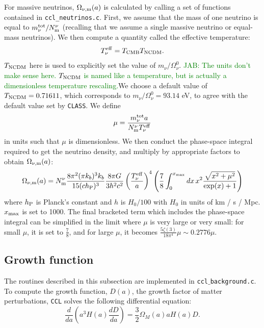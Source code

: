 \documentclass[\docopts]{\docclass}
\newcommand{\jab}[1]{\textcolor{green}{JAB: #1}}
\begin{document}
For massive neutrinos, $\Omega_{\nu, {\rm m}}(a)$ is calculated by calling a set of functions contained in {\tt ccl\_neutrinos.c}. First, we assume that the mass of one neutrino is equal to $m_{\nu}^{\rm tot} / N_{\rm m}^{\nu}$ (recalling that we assume a single massive neutrino or equal-mass neutrinos). We then compute a quantity called the effective temperature:
\begin{equation}
T_{\nu}^{\rm eff} = T_{\rm CMB} T_{\rm NCDM}.
\label{Tnueff}
\end{equation}
$T_{\rm NCDM}$ here is used to explicitly set the value of $m_{\nu} / \Omega_{\nu}^0$. \jab{The units don't make sense here. $T_{\rm NCDM}$ is named like a temperature, but is actually a dimensionless temperature rescaling.}We choose a default value of $T_{\rm NCDM} = 0.71611$, which corresponds to $m_{\nu} / \Omega_{\nu}^0 = 93.14$ eV, to agree with the default value set by {\tt CLASS}. We define 
\begin{equation}
\mu = \frac{m_{\nu}^{\rm tot}a}{N_{\rm m}^\nu T_{\nu}^{\rm eff}}
\label{mnuOT}
\end{equation}
in units such that $\mu$ is dimensionless. We then conduct the phase-space integral required to get the neutrino density, and multiply by appropriate factors to obtain $\Omega_{\nu, {\rm m}}(a)$:
\begin{equation}
\Omega_{\nu, {\rm m}}(a) = N_{\rm m}^\nu \frac{8 \pi^2(\pi k_b )^3 k_b}{15(c h_{\rm P})^3} \frac{8 \pi G}{3h^2c^2} \left(\frac{T_{\nu}^{\rm eff}}{a}\right)^4 \left(\frac{7}{8}\int_0^{x_{\rm max}} dx \, x^2 \frac{\sqrt{x^2 + \mu^2}}{\exp(x) + 1}\right)
\label{Omnu}
\end{equation}
where $h_{\rm P}$ is Planck's constant and $h$ is $H_0/100$ with $H_0$ in units of km / s / Mpc. $x_{\rm max}$ is set to 1000. The final bracketed term which includes the phase-space integral can be simplified in the limit where $\mu$ is very large or very small: for small $\mu$, it is set to $\frac{7}{8}$, and for large $\mu$, it becomes $\frac{5\zeta(3)}{18\pi^4}\mu\sim 0.2776\mu$.



\subsection{Growth function}
\label{sec:growth}

The routines described in this subsection are implemented in {\tt ccl$\_$background.c}.
To compute the growth function, $D(a)$, the growth factor of matter perturbations, {\tt CCL} solves the following differential equation:
\begin{equation}
  \frac{d}{da}\left(a^3H(a)\frac{dD}{da}\right)=\frac{3}{2}\Omega_M(a)aH(a)D.
\end{equation}
\end{document}
